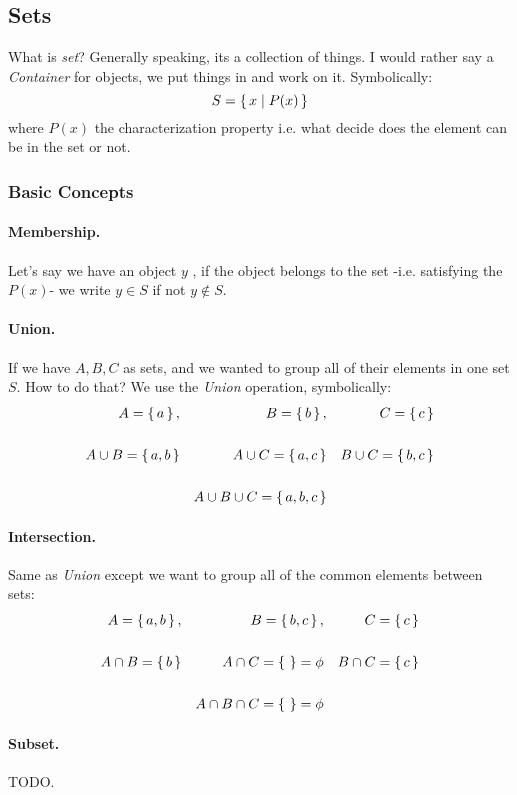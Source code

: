 \subsection{Sets}
What is {\it set}? Generally speaking, its a collection of things. I would rather say a {\it Container} for objects, we put things in and work on it. Symbolically:
$$
S = \set{x \mid P(x)}
$$
where $P(x)$ the characterization property i.e. what decide does the element can be in the set or not.
\subsubsection{Basic Concepts}
\paragraph{Membership.}
Let's say we have an object $y$ , if the object belongs to the set -i.e. satisfying the $P(x)$- we write $y \in S$ if not $y \not\in S$.
\paragraph{Union.}
If we have $A,B,C$ as sets, and we wanted to group all of their elements in one set $S$. How to do that? We use the {\it Union} operation, symbolically:
\begin{align*}
        \space A = \set{a} , && B = \set{b} , && C = \set{c} \\
        \\ 
        A \cup B = \set{a,b} && A \cup C = \set{a,c} && B \cup C = \set{b,c} \\
        \\
        && A \cup B \cup C = \set{a,b,c}
\end{align*}
\paragraph{Intersection.}
Same as {\it Union } except we want to group all of the common elements between sets:
\begin{align*}
        \space A = \set{a,b} , && B = \set{b,c} , && C = \set{c} \\
        \\ 
        A \cap B = \set{b} && A \cap C = \set{ } = \phi && B \cap C = \set{c} \\
        \\
        && A \cap B \cap C = \set{ } = \phi
\end{align*}
\paragraph{Subset.}
TODO.
